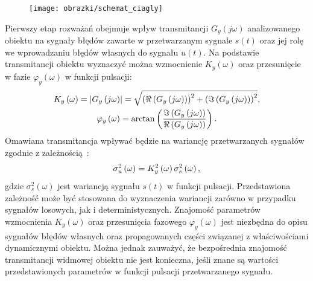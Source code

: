 \begin{figure}[htb!]
\begin{center}
\texttt{[image: obrazki/schemat\_ciagly]}
\end{center}
\end{figure}

Pierwszy etap rozważań obejmuje wpływ transmitancji $G_{y}(j\omega)$ analizowanego obiektu na sygnały błędów zawarte w przetwarzanym sygnale $s(t)$ oraz jej rolę we wprowadzaniu błędów własnych do sygnału $u(t)$. Na podstawie transmitancji obiektu wyznaczyć można wzmocnienie $K_{y}(\omega)$ oraz przesunięcie w fazie $\varphi_{y}(\omega)$ w funkcji pulsacji:
\begin{gather}
K_{y} \left(\omega\right) = \left| G_{y} \left(j\omega\right) \right| =
	\sqrt{\left( \Re \left( G_{y} \left(j\omega\right) \right) \right)^{2} +
	\left( \Im \left( G_{y} \left(j\omega\right) \right) \right)^{2}}
\label{eq:mid_cont_amp}, \\
\varphi_{y} \left(\omega\right) = \arctan \left( \frac{\Im \left( G_{y} \left(j\omega\right) \right)}{\Re \left( G_{y} \left(j\omega\right) \right)} \right) \label{eq:mid_cont_phi}.
\end{gather}
Omawiana transmitancja wpływać będzie na wariancję przetwarzanych sygnałów zgodnie z zależnością~\cite{oppenheim_sns}:
\begin{equation}
\sigma_{u}^{2} \left(\omega\right) = K_{y}^{2} \left(\omega\right) \sigma_{s}^{2} \left(\omega\right) \label{eq:mid_cont_var_omega},
\end{equation}
gdzie $\sigma_{s}^{2}(\omega)$ jest wariancją sygnału $s(t)$ w funkcji pulsacji. Przedstawiona zależność może być stosowana do wyznaczenia wariancji zarówno w przypadku sygnałów losowych, jak i deterministycznych. Znajomość parametrów wzmocnienia $K_{y}(\omega)$ oraz przesunięcia fazowego $\varphi_{y}(\omega)$ jest niezbędna do opisu sygnałów błędów własnych oraz propagowanych części związanej z właściwościami dynamicznymi obiektu. Można jednak zauważyć, że bezpośrednia znajomość transmitancji widmowej obiektu nie jest konieczna, jeśli znane są wartości przedstawionych parametrów w funkcji pulsacji przetwarzanego sygnału.

